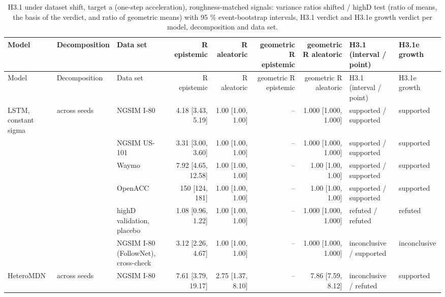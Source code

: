 \begingroup
\footnotesize
\begin{longtable}{lllrrrrll}
\caption{H3.1 under dataset shift, target a (one-step acceleration), roughness-matched signals: variance ratios shifted / highD test (ratio of means, the basis of the verdict, and ratio of geometric means) with 95 \% event-bootstrap intervals, H3.1 verdict and H3.1e growth verdict per model, decomposition and data set.}\label{tab:t2-h31--matched--a} \\
\toprule
Model & Decomposition & Data set & R epistemic & R aleatoric & geometric R epistemic & geometric R aleatoric & H3.1 (interval / point) & H3.1e growth \\
\midrule
\endfirsthead
\toprule
Model & Decomposition & Data set & R epistemic & R aleatoric & geometric R epistemic & geometric R aleatoric & H3.1 (interval / point) & H3.1e growth \\
\midrule
\endhead
\bottomrule
\endlastfoot
LSTM, constant sigma & across seeds & NGSIM I-80 & 4.18 [3.43, 5.19] & 1.00 [1.00, 1.00] & -- & 1.000 [1.000, 1.000] & supported / supported & supported \\
 &  & NGSIM US-101 & 3.31 [3.00, 3.60] & 1.00 [1.00, 1.00] & -- & 1.000 [1.000, 1.000] & supported / supported & supported \\
 &  & Waymo & 7.92 [4.65, 12.58] & 1.00 [1.00, 1.00] & -- & 1.00 [1.00, 1.00] & supported / supported & supported \\
 &  & OpenACC & 150 [124, 181] & 1.00 [1.00, 1.00] & -- & 1.00 [1.00, 1.00] & supported / supported & supported \\
 &  & highD validation, placebo & 1.08 [0.96, 1.22] & 1.00 [1.00, 1.00] & -- & 1.000 [1.000, 1.000] & refuted / refuted & refuted \\
 &  & NGSIM I-80 (FollowNet), cross-check & 3.12 [2.26, 4.67] & 1.00 [1.00, 1.00] & -- & 1.000 [1.000, 1.000] & inconclusive / supported & inconclusive \\
\midrule
HeteroMDN & across seeds & NGSIM I-80 & 7.61 [3.79, 19.17] & 2.75 [1.37, 8.10] & -- & 7.86 [7.59, 8.12] & inconclusive / refuted & supported \\

\end{longtable}

